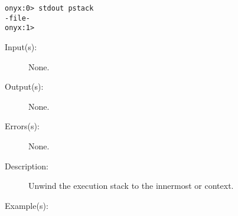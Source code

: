 \begin{description}
\begin{description}
\begin{verbatim}
onyx:0> stdout pstack
-file-
onyx:1>
		\end{verbatim}
	\end{description}
\label{systemdict:stop}
\item[{\onyxop{--}{stop}{--}}: ]
	\begin{description}\item[]
	\item[Input(s): ] None.
	\item[Output(s): ] None.
	\item[Errors(s): ] None.
	\item[Description: ]
		Unwind the execution stack to the innermost
		 or
		 context.
	\item[Example(s): ]\begin{verbatim}


\end{verbatim}
\end{description}
\end{description}
